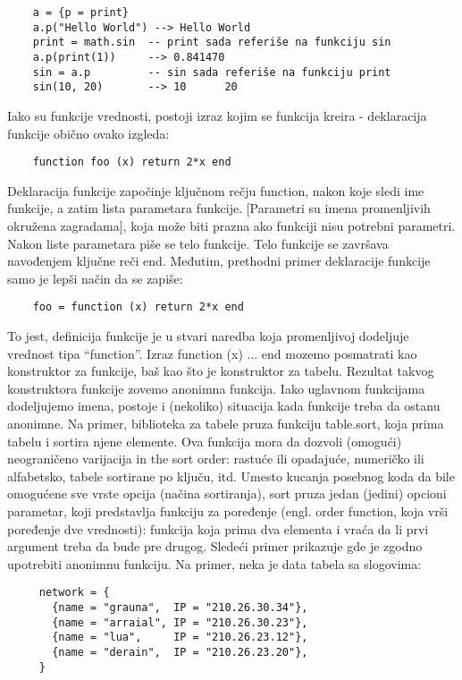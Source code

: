 \documentclass[a4paper]{article}
\begin{document}
\begin{verbatim}
    a = {p = print}
    a.p("Hello World") --> Hello World
    print = math.sin  -- print sada referiše na funkciju sin
    a.p(print(1))     --> 0.841470
    sin = a.p         -- sin sada referiše na funkciju print
	sin(10, 20)       --> 10      20
\end{verbatim}
Iako su funkcije vrednosti, postoji izraz kojim se funkcija kreira - deklaracija funkcije obično ovako izgleda:
\begin{verbatim}
    function foo (x) return 2*x end
\end{verbatim}
Deklaracija funkcije započinje ključnom rečju function, nakon koje sledi ime funkcije, a zatim lista parametara funkcije. [Parametri su imena promenljivih okružena zagradama], koja može biti prazna ako funkciji nisu potrebni parametri. Nakon liste parametara piše se telo funkcije. Telo funkcije se završava navođenjem ključne reči end.
Međutim, prethodni primer deklaracije funkcije samo je lepši način da se zapiše:
\begin{verbatim}
    foo = function (x) return 2*x end
\end{verbatim}
To jest, definicija funkcije je u stvari naredba koja promenljivoj dodeljuje vrednost tipa “function”. Izraz function (x) ... end mozemo posmatrati kao konstruktor za funkcije, baš kao što je {} konstruktor za tabelu. Rezultat takvog konstruktora funkcije zovemo anonimna funkcija. Iako uglavnom funkcijama dodeljujemo imena, postoje i (nekoliko) situacija kada funkcije treba da ostanu anonimne. Na primer, biblioteka za tabele pruza funkciju table.sort, koja prima tabelu i sortira njene elemente. Ova funkcija mora da dozvoli (omogući) neograničeno varijacija in the sort order: rastuće ili opadajuće, numeričko ili alfabetsko, tabele sortirane po ključu, itd. Umesto kucanja posebnog koda da bile omogućene sve vrste opcija (načina sortiranja), sort pruza jedan (jedini) opcioni parametar, koji predstavlja funkciju za poređenje (engl. order function, koja vrši poređenje dve vrednosti): funkcija koja prima dva elementa i vraća da li prvi argument treba da bude pre drugog. Sledeći primer prikazuje gde je zgodno upotrebiti anonimnu funkciju. Na primer, neka je data tabela sa slogovima:
\begin{verbatim}
     network = {
       {name = "grauna",  IP = "210.26.30.34"},
       {name = "arraial", IP = "210.26.30.23"},
       {name = "lua",     IP = "210.26.23.12"},
       {name = "derain",  IP = "210.26.23.20"},
     }
\end{verbatim}
\end{document}
